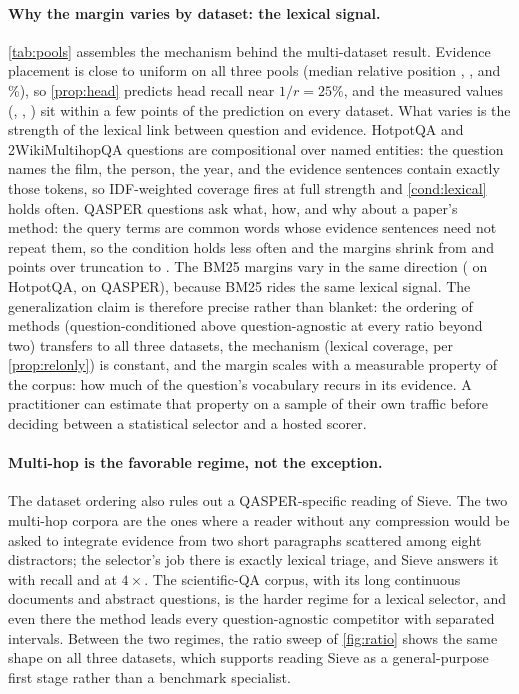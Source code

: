 \documentclass[preprint,12pt]{elsarticle}
\theoremstyle{remark}
\newcommand{\method}{Sieve}
\begin{document}
\paragraph{Why the margin varies by dataset: the lexical signal.}
\label{sec:lexsignal}
\autoref{tab:pools} assembles the mechanism behind the multi-dataset
result. Evidence placement is close to uniform on all three pools
(median relative position \PoolQMedPos, \PoolHMedPos, and
\PoolWMedPos\%), so \autoref{prop:head} predicts head recall near
$1/r = 25\%$, and the measured values (\RecQHea, \RecHHea,
\RecWHea) sit within a few points of the prediction on every
dataset. What varies is the strength of the lexical link between
question and evidence. HotpotQA and 2WikiMultihopQA questions are
compositional over named entities: the question names the film, the
person, the year, and the evidence sentences contain exactly those
tokens, so IDF-weighted coverage fires at full strength and
\autoref{cond:lexical} holds often. QASPER questions ask what, how,
and why about a paper's method: the query terms are common words
whose evidence sentences need not repeat them, so the condition holds
less often and the margins shrink from \PairHSH{} and \PairWSH{}
points over truncation to \PairQSH{}. The BM25 margins vary in the
same direction (\PairHSBm{} on HotpotQA, \PairQSBm{} on QASPER),
because BM25 rides the same lexical signal. The generalization claim
is therefore precise rather than blanket: the ordering of methods
(question-conditioned above question-agnostic at every ratio beyond
two) transfers to all three datasets, the mechanism (lexical
coverage, per \autoref{prop:relonly}) is constant, and the margin
scales with a measurable property of the corpus: how much of the
question's vocabulary recurs in its evidence. A practitioner can
estimate that property on a sample of their own traffic before
deciding between a statistical selector and a hosted scorer.

\paragraph{Multi-hop is the favorable regime, not the exception.}
The dataset ordering also rules out a QASPER-specific reading of
\method{}. The two multi-hop corpora are the ones where a reader
without any compression would be asked to integrate evidence from two
short paragraphs scattered among eight distractors; the selector's job
there is exactly lexical triage, and \method{} answers it with recall
\RecHSie{} and \RecWSie{} at $4\times$. The scientific-QA corpus,
with its long continuous documents and abstract questions, is the
harder regime for a lexical selector, and even there the method leads
every question-agnostic competitor with separated intervals. Between
the two regimes, the ratio sweep of \autoref{fig:ratio} shows the same
shape on all three datasets, which supports reading \method{} as a
general-purpose first stage rather than a benchmark specialist.
\end{document}
